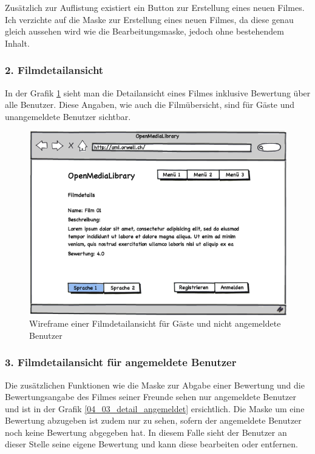 Zusätzlich zur Auflistung existiert ein Button zur Erstellung eines neuen Filmes.
Ich verzichte auf die Maske zur Erstellung eines neuen Filmes, da diese genau gleich
aussehen wird wie die Bearbeitungsmaske, jedoch ohne bestehendem Inhalt.

\subsubsection{2. Filmdetailansicht}
In der Grafik \ref{04_02_detail} sieht man die Detailansicht eines Filmes inklusive Bewertung
über alle Benutzer. Diese Angaben, wie auch die Filmübersicht, sind für Gäste und
unangemeldete Benutzer sichtbar.

\begin{figure}[ht]
    \begin{center}
        \includegraphics[width=1\textwidth,angle=0]{./wireframes/04_02_detail.png}
        \caption{Wireframe einer Filmdetailansicht für Gäste und nicht angemeldete Benutzer}
        \label{04_02_detail}
    \end{center}
\end{figure}

\clearpage

\subsubsection{3. Filmdetailansicht für angemeldete Benutzer}
Die zusätzlichen Funktionen wie die Maske zur Abgabe einer Bewertung und die Bewertungsangabe des Filmes 
seiner Freunde sehen nur angemeldete Benutzer und ist in der Grafik \ref{04_03_detail_angemeldet} 
ersichtlich. Die Maske um eine Bewertung abzugeben ist zudem nur zu sehen, sofern der angemeldete
Benutzer noch keine Bewertung abgegeben hat. In diesem Falle sieht der Benutzer an dieser
Stelle seine eigene Bewertung und kann diese bearbeiten oder entfernen.

